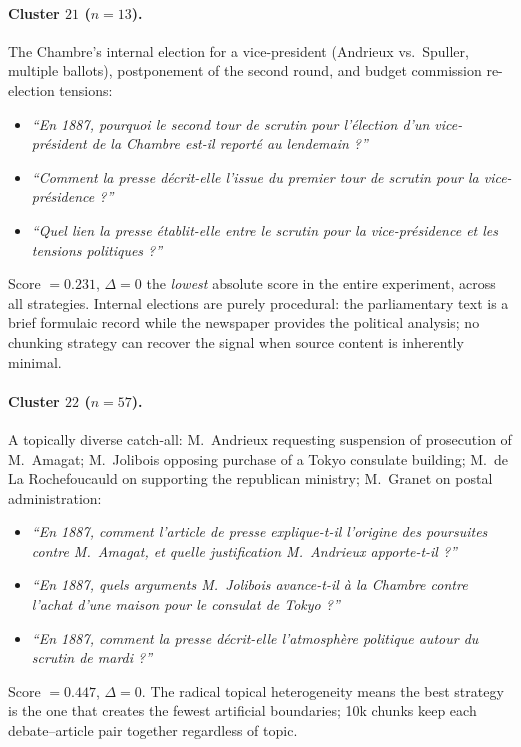 \paragraph{Cluster $21$ ($n=13$).}
The Chambre's internal election for a vice-president (Andrieux vs.~Spuller,
multiple ballots), postponement of the second round, and budget commission
re-election tensions:
\begin{itemize}
  \item \textit{``En 1887, pourquoi le second tour de scrutin pour l'\'{e}lection
    d'un vice-pr\'{e}sident de la Chambre est-il report\'{e} au lendemain ?''}
  \item \textit{``Comment la presse d\'{e}crit-elle l'issue du premier tour de
    scrutin pour la vice-pr\'{e}sidence ?''}
  \item \textit{``Quel lien la presse \'{e}tablit-elle entre le scrutin pour la
    vice-pr\'{e}sidence et les tensions politiques ?''}
\end{itemize}
Score $= 0.231$, $\Delta = 0$ the \emph{lowest} absolute score in the entire
experiment, across all strategies.
Internal elections are purely procedural: the parliamentary text is a brief
formulaic record while the newspaper provides the political analysis; no chunking
strategy can recover the signal when source content is inherently minimal.

\paragraph{Cluster $22$ ($n=57$).}
A topically diverse catch-all: M.~Andrieux requesting suspension of prosecution
of M.~Amagat; M.~Jolibois opposing purchase of a Tokyo consulate building;
M.~de La Rochefoucauld on supporting the republican ministry; M.~Granet on
postal administration:
\begin{itemize}
  \item \textit{``En 1887, comment l'article de presse explique-t-il l'origine
    des poursuites contre M.~Amagat, et quelle justification M.~Andrieux
    apporte-t-il ?''}
  \item \textit{``En 1887, quels arguments M.~Jolibois avance-t-il \`{a} la
    Chambre contre l'achat d'une maison pour le consulat de Tokyo ?''}
  \item \textit{``En 1887, comment la presse d\'{e}crit-elle l'atmosph\`{e}re
    politique autour du scrutin de mardi ?''}
\end{itemize}
Score $= 0.447$, $\Delta = 0$.
The radical topical heterogeneity means the best strategy is the one that creates
the fewest artificial boundaries; 10k chunks keep each debate--article pair
together regardless of topic.

